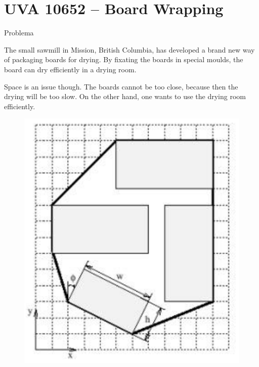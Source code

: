\section{UVA 10652 -- Board Wrapping}

\begin{frame}[fragile]{Problema}

\begin{minipage}{0.5\textwidth}
The small sawmill in Mission, British Columbia, has
developed a brand new way of packaging boards for
drying. By fixating the boards in special moulds, the
board can dry efficiently in a drying room.

Space is an issue though. The boards cannot be
too close, because then the drying will be too slow.
On the other hand, one wants to use the drying room
efficiently.
\end{minipage}
\begin{minipage}{0.45\textwidth}
\begin{figure}
    \centering
    \includegraphics[scale=0.6]{10652.png}
\end{figure}
\end{minipage}

\end{frame}

